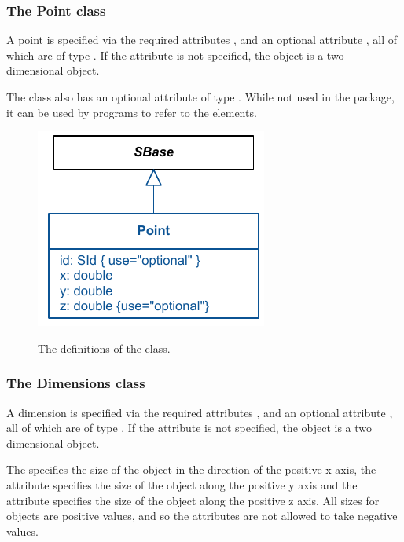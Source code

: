 \subsubsection{The Point class} \label{point-class} 
\label{position-class} A point is specified via the required attributes 
,  and an optional attribute , all of which 
are of type . If the attribute  is not 
specified, the object is a two dimensional object. 

The \Point class also has an optional attribute  of type 
. While not used in the \Layout package, it can be used 
by programs to refer to the elements. 

\begin{figure}[!ht]
\includegraphics{uml/layout-point-uml}\\
\caption{The definitions of the \Point class.}
\label{uml:point}
\end{figure}

\subsubsection{The Dimensions class} \label{dimensions-class} A 
dimension is specified via the required attributes , 
 and an optional attribute , all of which are 
of type . If the attribute  is not 
specified, the object is a two dimensional object. 

The  specifies the size of the object in the direction of 
the positive x axis, the  attribute specifies the size of 
the object along the positive y axis and the  attribute 
specifies the size of the object along the positive z axis. All sizes 
for \Dimensions objects are positive values, and so the attributes are 
not allowed to take negative values. 

